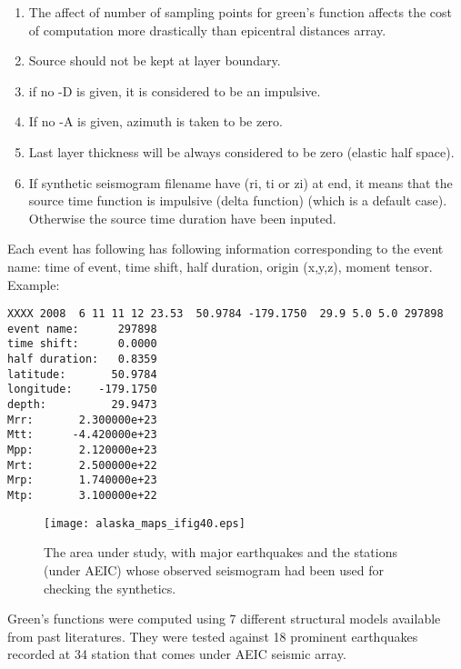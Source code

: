 \documentclass[11pt,titlepage,fleqn]{article}
\begin{document}
\begin{enumerate}
\item The affect of number of sampling points for green's function affects the cost of computation more drastically than epicentral distances array.

\item Source should not be kept at layer boundary.

\item if no -D is given, it is considered to be an impulsive.

\item If no -A is given, azimuth is taken to be zero.

\item Last layer thickness will be always considered to be zero (elastic half space).

\item If synthetic seismogram filename have (ri, ti or zi) at end, it means that the source time function is impulsive (delta function) (which is a default case). Otherwise the source time duration have been inputed.
\end{enumerate}


\pagebreak
{}

Each event has following has following information corresponding to the event name: time of event, time shift, half duration, origin (x,y,z), moment tensor.
Example:
\begin{verbatim}
XXXX 2008  6 11 11 12 23.53  50.9784 -179.1750  29.9 5.0 5.0 297898
event name:      297898
time shift:      0.0000
half duration:   0.8359
latitude:       50.9784
longitude:    -179.1750
depth:          29.9473
Mrr:       2.300000e+23
Mtt:      -4.420000e+23
Mpp:       2.120000e+23
Mrt:       2.500000e+22
Mrp:       1.740000e+23
Mtp:       3.100000e+22
\end{verbatim}

\begin{figure}
\begin{center}
\texttt{[image: alaska\_maps\_ifig40.eps]}
\caption[]
{{
The area under study, with major earthquakes and the stations (under AEIC) whose observed seismogram had been used for checking the synthetics. 
\label{fig:map}
}}
\end{center}
\end{figure}

Green's functions were computed using 7 different structural models available from past literatures. They were tested against 18 prominent earthquakes recorded at 34 station that comes under AEIC seismic array.
\end{document}
